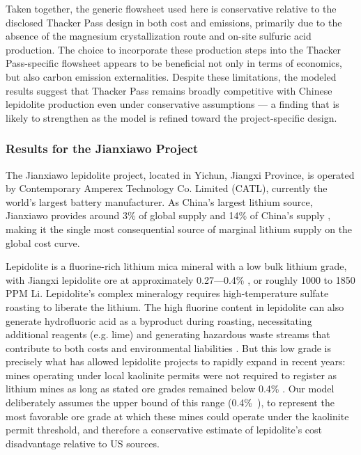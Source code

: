 Taken together, the generic flowsheet used here is conservative relative to the disclosed Thacker Pass design in both cost and emissions, primarily due to the absence of the magnesium crystallization route and on-site sulfuric acid production. The choice to incorporate these production steps into the Thacker Pass-specific flowsheet appears to be beneficial not only in terms of economics, but also carbon emission externalities. Despite these limitations, the modeled results suggest that Thacker Pass remains broadly competitive with Chinese lepidolite production even under conservative assumptions --- a finding that is likely to strengthen as the model is refined toward the project-specific design.

\subsubsection{Results for the Jianxiawo Project}\label{sec:04-jianxiawo}

The Jianxiawo lepidolite project, located in Yichun, Jiangxi Province, is operated by Contemporary Amperex Technology Co. Limited (CATL), currently the world's largest battery manufacturer. As China's largest lithium source, Jianxiawo provides around 3\% of global supply and 14\% of China's supply \cite{liChinasCATLSuspends2025, andrezejewskiResourcesEnergyQuarterly2025, usgeologicalsurveyMineralCommoditySummaries2026}, making it the single most consequential source of marginal lithium supply on the global cost curve.

Lepidolite is a fluorine-rich lithium mica mineral with a low bulk lithium grade, with Jiangxi lepidolite ore at approximately 0.27---0.4\%  \cite{sulcaLithiumPricesWhere2024}, or roughly 1000 to 1850 PPM Li.  Lepidolite's complex mineralogy requires high-temperature sulfate roasting to liberate the lithium. The high fluorine content in lepidolite can also generate hydrofluoric acid as a byproduct during roasting, necessitating additional reagents (e.g. lime) and generating hazardous waste streams that contribute to both costs and environmental liabilities \cite{yanExtractionLithiumLepidolite2012, dengSystematicReviewSulfate2026}. But this low grade is precisely what has allowed lepidolite projects to rapidly expand in recent years: mines operating under local kaolinite permits were not required to register as lithium mines as long as stated ore grades remained below 0.4\% \cite{zhangChinaHasDomestic2025}. Our model deliberately assumes the upper bound of this range (0.4\%~), to represent the most favorable ore grade at which these mines could operate under the kaolinite permit threshold, and therefore a conservative estimate of lepidolite's cost disadvantage relative to US sources.

